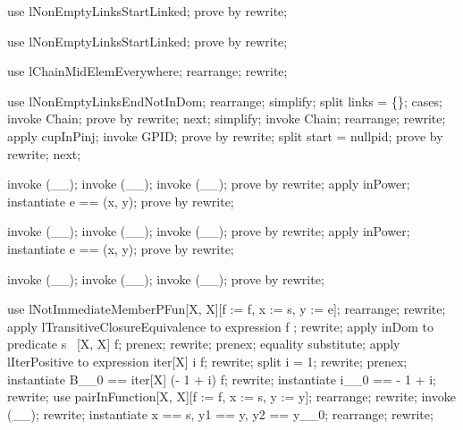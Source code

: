 
\begin{forget}
use lNonEmptyLinksStartLinked;
prove by rewrite;
\end{forget}

\begin{forget}
use lNonEmptyLinksStartLinked;
prove by rewrite;
\end{forget}

\begin{forget}
use lChainMidElemEverywhere;
rearrange;
rewrite;
\end{forget}
\begin{forget}[lLinksPushUpdateIsPInj]
use lNonEmptyLinksEndNotInDom;
rearrange;
simplify;
split links = \{\};
cases;
invoke Chain;
prove by rewrite;
next;
simplify;
invoke Chain;
rearrange;
rewrite;
apply cupInPinj;
invoke GPID;
prove by rewrite;
split start = nullpid;
prove by rewrite;
next;
\end{forget}

\begin{forget}[lLinksDomElemType]
invoke (\_\pinj \_);
invoke (\_\pfun \_);
invoke (\_\rel \_);
prove by rewrite;
apply inPower;
instantiate e == (x, y);
prove by rewrite;
\end{forget}

\begin{forget}[lLinksRanElemType]
invoke (\_\pinj \_);
invoke (\_\pfun \_);
invoke (\_\rel \_);
prove by rewrite;
apply inPower;
instantiate e == (x, y);
prove by rewrite;
\end{forget}

\begin{forget}[lLinksElemType]
invoke (\_\pinj \_);
invoke (\_\pfun \_);
invoke (\_\rel \_);
prove by rewrite;
\end{forget}


\begin{forget}[lTransClosureOneStepForwardChainTraversal]
use lNotImmediateMemberPFun[X, X][f := f, x := s, y := e];
rearrange;
rewrite;
apply lTransitiveClosureEquivalence to expression f \plus [X];
rewrite;
apply inDom to predicate s \in  \dom~[X, X] f;
prenex;
rewrite;
prenex;
equality substitute;
apply lIterPositive to expression iter[X] i f;
rewrite;
split i = 1;
rewrite;
prenex;
instantiate B\_\_0 == iter[X] (- 1 + i) f;
rewrite;
instantiate i\_\_0 == - 1 + i;
rewrite;
use pairInFunction[X, X][f := f, x := s, y := y];
rearrange;
rewrite;
invoke (\_\pfun \_);
rewrite;
instantiate x == s, y1 == y, y2 == y\_\_0;
rearrange;
rewrite;
\end{forget}

